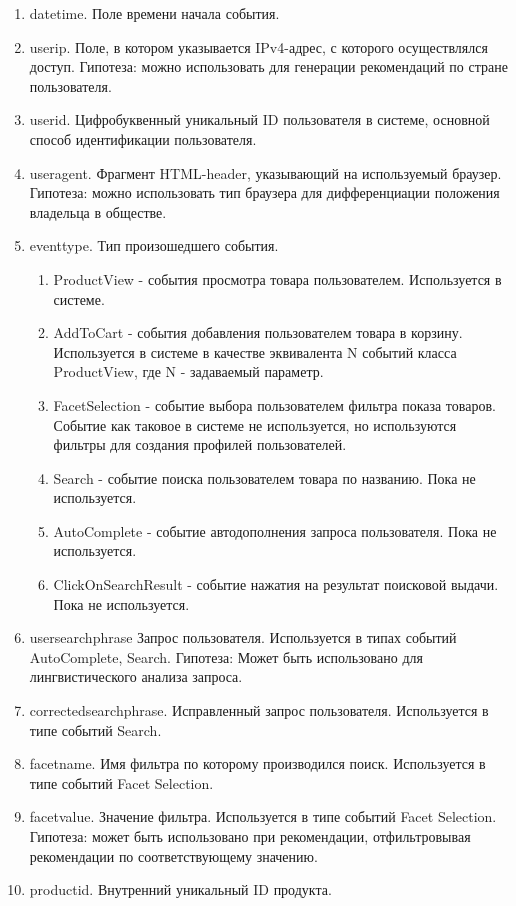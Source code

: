 \documentclass[14pt]{mmcs_article}
\newenvironment{myenumerate}
{ \begin{enumerate}
		\setlength{\itemsep}{0pt}
		\setlength{\parskip}{0pt}
		\setlength{\parsep}{0pt}     }
	{ \end{enumerate}                  }
\begin{document}
\begin{myenumerate}
	\item datetime. Поле времени начала события. 
	\item userip. Поле, в котором указывается IPv4-адрес, с которого осуществлялся доступ. Гипотеза: можно использовать для генерации рекомендаций по стране пользователя.
	\item userid. Цифробуквенный уникальный ID пользователя в системе, основной способ идентификации пользователя.
	\item useragent. Фрагмент HTML-header, указывающий на используемый браузер. Гипотеза: можно использовать тип браузера для дифференциации положения владельца в обществе.
	\item eventtype. Тип произошедшего события. 
	\begin{myenumerate}
		\item ProductView - события просмотра товара пользователем. Используется в системе.
		\item AddToCart - события добавления пользователем товара в корзину. Используется в системе в качестве эквивалента N событий класса ProductView, где N - задаваемый параметр.
		\item FacetSelection - событие выбора пользователем фильтра показа товаров.  Событие как таковое в системе не используется, но используются фильтры для создания профилей пользователей.
		\item Search - событие поиска пользователем товара по названию. Пока не используется.
		\item AutoComplete - событие автодополнения запроса пользователя. Пока не используется.
		\item ClickOnSearchResult - событие нажатия на результат поисковой выдачи. Пока не используется.
	\end{myenumerate}
	\item usersearchphrase Запрос пользователя. Используется в типах событий AutoComplete, Search. Гипотеза: Может быть использовано для лингвистического анализа запроса.
	\item correctedsearchphrase. Исправленный запрос пользователя. Используется в типе событий Search. 
	\item facetname. Имя фильтра по которому производился поиск. Используется в типе событий Facet Selection. 
	\item facetvalue. Значение фильтра. Используется в типе событий Facet Selection. Гипотеза: может быть использовано при рекомендации, отфильтровывая рекомендации по соответствующему значению. 
	\item productid. Внутренний уникальный ID продукта. 
\end{myenumerate}
\end{document}
